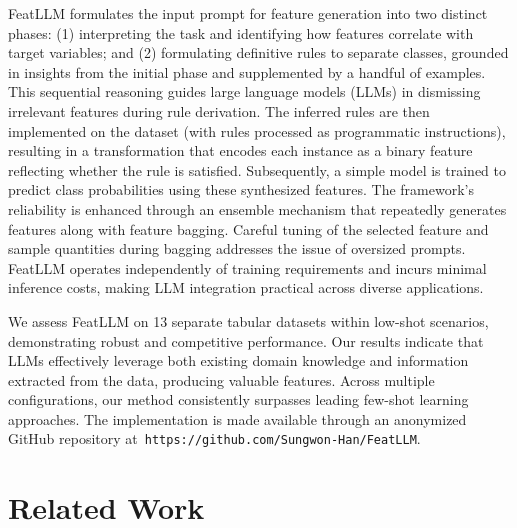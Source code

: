 \textsf{FeatLLM} formulates the input prompt for feature generation into two distinct phases: (1) interpreting the task and identifying how features correlate with target variables; and (2) formulating definitive rules to separate classes, grounded in insights from the initial phase and supplemented by a handful of examples. This sequential reasoning guides large language models (LLMs) in dismissing irrelevant features during rule derivation. The inferred rules are then implemented on the dataset (with rules processed as programmatic instructions), resulting in a transformation that encodes each instance as a binary feature reflecting whether the rule is satisfied. Subsequently, a simple model is trained to predict class probabilities using these synthesized features. The framework's reliability is enhanced through an ensemble mechanism that repeatedly generates features along with feature bagging. Careful tuning of the selected feature and sample quantities during bagging addresses the issue of oversized prompts. \textsf{FeatLLM} operates independently of training requirements and incurs minimal inference costs, making LLM integration practical across diverse applications.

We assess \textsf{FeatLLM} on 13 separate tabular datasets within low-shot scenarios, demonstrating robust and competitive performance. Our results indicate that LLMs effectively leverage both existing domain knowledge and information extracted from the data, producing valuable features. Across multiple configurations, our method consistently surpasses leading few-shot learning approaches. The implementation is made available through an anonymized GitHub repository at~\texttt{https://github.com/Sungwon-Han/FeatLLM}.

\section{Related Work}

